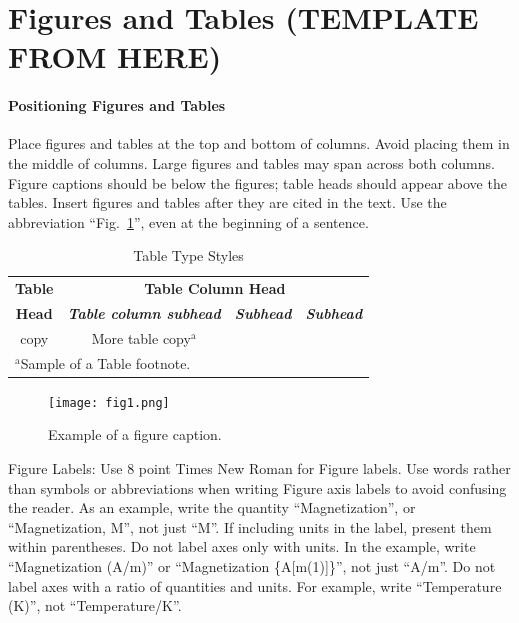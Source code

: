 \documentclass[conference]{IEEEtran}
\begin{document}
\iffalse

\section{Figures and Tables (TEMPLATE FROM HERE)}
\paragraph{Positioning Figures and Tables} Place figures and tables at the top and 
bottom of columns. Avoid placing them in the middle of columns. Large 
figures and tables may span across both columns. Figure captions should be 
below the figures; table heads should appear above the tables. Insert 
figures and tables after they are cited in the text. Use the abbreviation 
``Fig.~\ref{fig}'', even at the beginning of a sentence.

\begin{table}[htbp]
\caption{Table Type Styles}
\begin{center}
\begin{tabular}{|c|c|c|c|}
\hline
\textbf{Table}&\multicolumn{3}{|c|}{\textbf{Table Column Head}} \\
\cline{2-4} 
\textbf{Head} & \textbf{\textit{Table column subhead}}& \textbf{\textit{Subhead}}& \textbf{\textit{Subhead}} \\
\hline
copy& More table copy$^{\mathrm{a}}$& &  \\
\hline
\multicolumn{4}{l}{$^{\mathrm{a}}$Sample of a Table footnote.}
\end{tabular}
\label{tab1}
\end{center}
\end{table}

\begin{figure}[htbp]
\centerline{\texttt{[image: fig1.png]}}
\caption{Example of a figure caption.}
\label{fig}
\end{figure}

Figure Labels: Use 8 point Times New Roman for Figure labels. Use words 
rather than symbols or abbreviations when writing Figure axis labels to 
avoid confusing the reader. As an example, write the quantity 
``Magnetization'', or ``Magnetization, M'', not just ``M''. If including 
units in the label, present them within parentheses. Do not label axes only 
with units. In the example, write ``Magnetization (A/m)'' or ``Magnetization 
\{A[m(1)]\}'', not just ``A/m''. Do not label axes with a ratio of 
quantities and units. For example, write ``Temperature (K)'', not 
``Temperature/K''.
\end{document}
